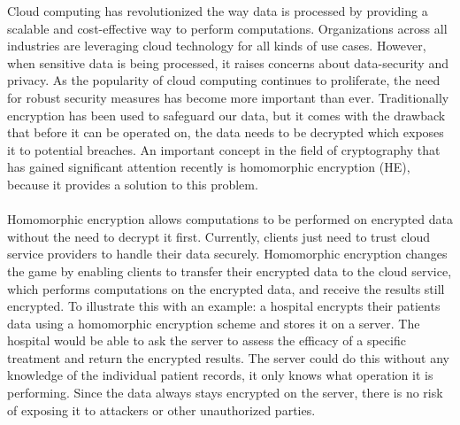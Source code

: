 \documentclass[english,master=eelt,masteroption=ec]{kulemt}
\begin{document}
Cloud computing has revolutionized the way data is processed by providing a scalable and cost-effective way to perform computations. Organizations across all industries are leveraging cloud technology for all kinds of use cases. However, when sensitive data is being processed, it raises concerns about data-security and privacy. As the popularity of cloud computing continues to proliferate, the need for robust security measures has become more important than ever. Traditionally encryption has been used to safeguard our data, but it comes with the drawback that before it can be operated on, the data needs to be decrypted which exposes it to potential breaches. An important concept in the field of cryptography that has gained significant attention recently is homomorphic encryption (HE), because it provides a solution to this problem. 
\\\\
Homomorphic encryption allows computations to be performed on encrypted data without the need to decrypt it first. Currently, clients just need to trust cloud service providers to handle their data securely. Homomorphic encryption changes the game by enabling clients to transfer their encrypted data to the cloud service, which performs computations on the encrypted data, and receive the results still encrypted. To illustrate this with an example: a hospital encrypts their patients data using a homomorphic encryption scheme and stores it on a server. The hospital would be able to ask the server to assess the efficacy of a specific treatment and return the encrypted results. The server could do this without any knowledge of the individual patient records, it only knows what operation it is performing. Since the data always stays encrypted on the server, there is no risk of exposing it to attackers or other unauthorized parties.
\pagebreak
\end{document}

